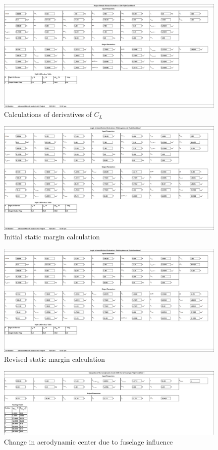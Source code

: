 \documentclass[conf]{new-aiaa}
\begin{document}
\begin{figure}[H]
    \includegraphics[width=\textwidth]{Report3Printouts/Stability/CL_alpha.png}
    \caption{Calculations of derivatives of $C_L$}
    \label{fig:cl_alpha}
\end{figure}

\begin{figure}[H]
    \includegraphics[width=\textwidth]{Report3Printouts/Stability/CM_alpha.png}
    \caption{Initial static margin calculation}
    \label{fig:cm_alpha}
\end{figure}

\begin{figure}[H]
    \includegraphics[width=\textwidth]{Report3Printouts/Stability/CM_alpha_final.png}
    \caption{Revised static margin calculation}
    \label{fig:cm_alpha_final}
\end{figure}

\begin{figure}[H]
    \includegraphics[width=\textwidth]{Report3Printouts/Stability/delta_x_ac_f_cropped.png}
    \caption{Change in aerodynamic center due to fuselage influence}
    \label{fig:delta_x_ac_f}
\end{figure}
\end{document}
